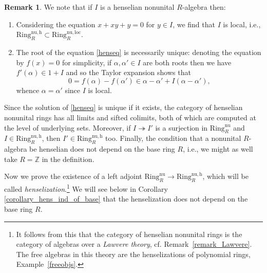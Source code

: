 \documentclass{amsart}
\theoremstyle{definition}
\newtheorem{remark}[definition]{Remark}
\newcommand{\nuloc}{\mathrm{Ring}^{\mathrm{nu,loc}}_R}
\newcommand{\nur}{\mathrm{Ring}^{\mathrm{nu}}_R}
\newcommand{\nuh}{\mathrm{Ring}^{\mathrm{nu,h}}_R}
\begin{document}
\begin{remark} 

We note that if $I$ is a henselian nonunital $R$-algebra then:
\begin{enumerate}
\item Considering the equation $x + xy + y = 0$ for $y \in I$, we find that $I$
is local, i.e., $\nuh \subset \nuloc$.
\item The root of the equation \eqref{henseq} is necessarily unique: denoting
the equation by $f(x)=0$ for simplicity, if $\alpha,
\alpha' \in I$ are both roots then we have $f'(\alpha) \in 1 + I$ and  
so the Taylor expansion shows that 
$$0 = f(\alpha) - f(\alpha')   \in  \alpha - \alpha' + I(\alpha - \alpha'),$$ whence 
$\alpha = \alpha'$ since $I$ is local.
\end{enumerate}

\end{remark} 

Since the solution of \eqref{henseq} is unique if it exists, the category of henselian nonunital rings has all limits and sifted colimits, both of which are computed at the level of underlying sets. 
Moreover, if $I \twoheadrightarrow I'$ is a surjection in $\nur$
and $I \in \nuh$, then $I' \in \nuh$ too. 
Finally, the condition that a nonunital $R$-algebra be henselian does
not depend on the base ring $R$, i.e., we might as well take $R = \mathbb{Z}$ in
the definition.


Now we prove the existence of a left adjoint $\nur \to \nuh$, which will be
called \emph{henselization}.\footnote{It follows from this that the category of henselian
nonunital rings is the category of algebras over a \emph{Lawvere theory}, cf.
Remark~\ref{remark_Lawvere}. The free algebras in this theory are the
henselizations of polynomial rings, Example~\ref{freeobjs}.}
We will see below in Corollary \ref{corollary_hens_ind_of_base} that the henselization does not depend on the base ring $R$.
\end{document}
